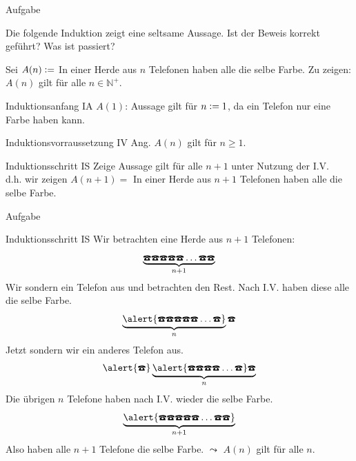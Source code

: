 {
	\begin{frame}[fragile]{Aufgabe}
		\begin{alertblock}{Die folgende Induktion zeigt eine seltsame Aussage.}
			Ist der Beweis korrekt geführt? Was ist passiert?
		\end{alertblock}
		Sei $A(n)\vcentcolon=$ In einer Herde aus $n$ Telefonen haben alle die selbe Farbe.
		Zu zeigen: $A(n)$ gilt für alle $n \in \mathbb{N}^+$.
		\begin{alertblock}{Induktionsanfang IA}
			$A(1)$: Aussage gilt für $n\vcentcolon= 1$, da ein Telefon nur eine Farbe haben kann.
		\end{alertblock}
		\begin{alertblock}{Induktionsvorraussetzung IV}
			Ang. $A(n)$ gilt für $n\geq1$.
		\end{alertblock}
		\begin{alertblock}{Induktionsschritt IS}
			Zeige Aussage gilt für alle $n+1$ unter Nutzung der I.V.\\
			d.h. wir zeigen $A(n+1)=$ In einer Herde aus $n+1$ Telefonen haben alle die selbe Farbe.
		\end{alertblock}
	\end{frame}
	\begin{frame}[fragile]{Aufgabe}
		\footnotesize{
			\begin{alertblock}{Induktionsschritt IS}
				Wir betrachten eine Herde aus $n+1$ Telefonen:
				\[\underbrace{\text{\Telefon}\text{\Telefon}\text{\Telefon}\text{\Telefon}\text{\Telefon}\dots\text{\Telefon}\text{\Telefon}}_{n+1}\]
				Wir sondern ein Telefon aus und betrachten den Rest. Nach I.V. haben diese alle die selbe Farbe.
				\[\underbrace{\alert{\text{\Telefon}\text{\Telefon}\text{\Telefon}\text{\Telefon}\text{\Telefon}\dots\text{\Telefon}}}_{n}\text{\Telefon}\]
				Jetzt sondern wir ein anderes Telefon aus.
				\[\alert{\text{\Telefon}}\underbrace{\alert{\text{\Telefon}\text{\Telefon}\text{\Telefon}\text{\Telefon}\dots\text{\Telefon}}\text{\Telefon}}_{n}\]
				Die übrigen $n$ Telefone haben nach I.V. wieder die selbe Farbe.
				\[\underbrace{\alert{\text{\Telefon}\text{\Telefon}\text{\Telefon}\text{\Telefon}\text{\Telefon}\dots\text{\Telefon}\text{\Telefon}}}_{n+1}\]
				Also haben alle $n+1$ Telefone die selbe Farbe.
				$\leadsto$ $A(n)$ gilt für alle $n$.
			\end{alertblock}
		}
	\end{frame}
}

